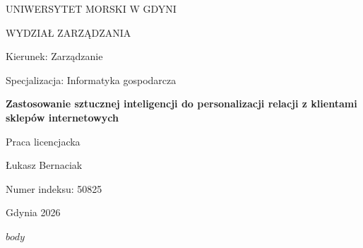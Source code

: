 \documentclass[12pt,a4paper]{article}
\begin{document}
\begin{titlepage}
\centering
{\large UNIWERSYTET MORSKI W GDYNI\par}
\vspace{0.4cm}
{\large WYDZIAŁ ZARZĄDZANIA\par}
\vspace{0.8cm}
Kierunek: Zarządzanie\par
Specjalizacja: Informatyka gospodarcza\par
\vspace{2.2cm}
{\Large\bfseries Zastosowanie sztucznej inteligencji do personalizacji relacji z klientami sklepów internetowych\par}
\vspace{1.1cm}
{\large Praca licencjacka\par}
\vspace{1.8cm}
{\large Łukasz Bernaciak\par}
Numer indeksu: 50825\par
\vfill
Gdynia 2026
\end{titlepage}
\setcounter{page}{2}
\begingroup
{}
\small
\tableofcontents
\endgroup
$body$
\end{document}
